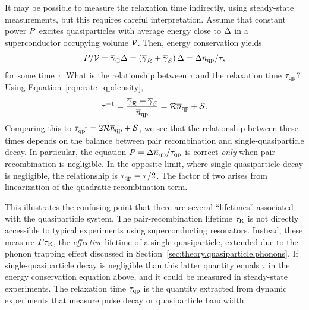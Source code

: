 It may be possible to measure the relaxation time indirectly, using steady-state measurements, but this requires careful interpretation.
Assume that constant power $P$ excites quasiparticles with average energy close to $\Delta$ in a superconductor occupying volume $\mathcal{V}$.
Then, energy conservation yields
\begin{equation}
P / \mathcal{V}
  =
  \overline{\gamma}_{\mathrm{G}} \Delta
  =
  \left( \overline{\gamma}_{\mathcal{R}} + \overline{\gamma}_{\mathcal{S}} \right) \Delta
  =
  \Delta n_{\mathrm{qp}} / \tau,
\end{equation}
for some time $\tau$.
What is the relationship between $\tau$ and the relaxation time $\tau_{\mathrm{qp}}$?
Using Equation~\ref{eqn:rate_qpdensity}, 
\begin{equation}
\tau^{-1}
  =
  \frac{\overline{\gamma}_{\mathcal{R}} + \overline{\gamma}_{\mathcal{S}}}{\overline{n}_{\mathrm{qp}}}
  =
  \mathcal{R} \overline{n}_{\mathrm{qp}} + \mathcal{S}.
\end{equation}
Comparing this to
$\tau_{\mathrm{qp}}^{-1} = 2 \mathcal{R} \overline{n}_{\mathrm{qp}} + \mathcal{S}$,
we see that the relationship between these times depends on the balance between pair recombination and single-quasiparticle decay.
In particular, the equation
$P = \Delta \overline{n}_{\mathrm{qp}} / \tau_{\mathrm{qp}}$
is correct \textit{only} when pair recombination is negligible.
In the opposite limit, where single-quasiparticle decay is negligible, the relationship is $\tau_{\mathrm{qp}} = \tau / 2$.
The factor of two arises from linearization of the quadratic recombination term.

This illustrates the confusing point that there are several ``lifetimes'' associated with the quasiparticle system.
The pair-recombination lifetime $\tau_\mathrm{R}$ is not directly accessible to typical experiments using superconducting resonators.
Instead, these measure $F \tau_\mathrm{R}$, the \textit{effective} lifetime of a single quasiparticle, extended due to the phonon trapping effect discussed in Section~\ref{sec:theory.quasiparticle.phonons}.
If single-quasiparticle decay is negligible than this latter quantity equals $\tau$ in the energy conservation equation above, and it could be measured in steady-state experiments.
The relaxation time $\tau_{\mathrm{qp}}$ is the quantity extracted from dynamic experiments that measure pulse decay or quasiparticle bandwidth.
